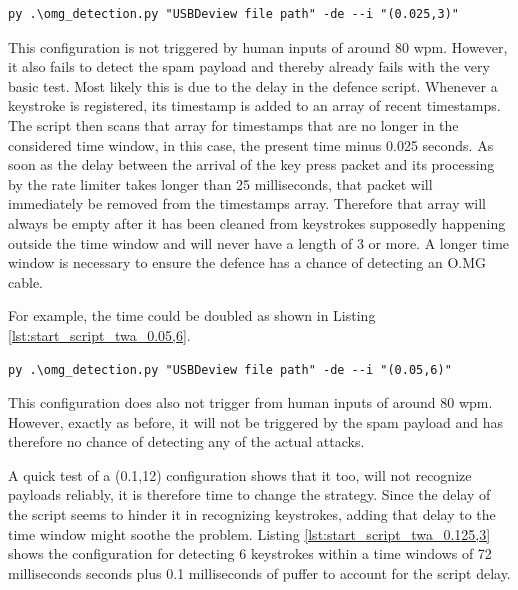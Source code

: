 \begin{lstlisting}[caption={start defence Script with TWA (0.025,3)},label={lst:start_script_twa_0.025,3}, captionpos=b]
 py .\omg_detection.py "USBDeview file path" -de --i "(0.025,3)"
\end{lstlisting}



This configuration is not triggered by human inputs of around 80 wpm. However, it also fails to detect the spam payload and thereby already fails with the very basic test. Most likely this is due to the delay in the defence script. Whenever a keystroke is registered, its timestamp is added to an array of recent timestamps. The script then scans that array for timestamps that are no longer in the considered time window, in this case, the present time minus 0.025 seconds. As soon as the delay between the arrival of the key press packet and its processing by the rate limiter takes longer than 25 milliseconds, that packet will immediately be removed from the timestamps array. Therefore that array will always be empty after it has been cleaned from keystrokes supposedly happening outside the time window and will never have a length of 3 or more. A longer time window is necessary to ensure the defence has a chance of detecting an O.MG cable.

For example, the time could be doubled as shown in Listing \ref{lst:start_script_twa_0.05,6}.

\begin{lstlisting}[caption={start defence Script with TWA (0.05,6)},label={lst:start_script_twa_0.05,6}, captionpos=b]
 py .\omg_detection.py "USBDeview file path" -de --i "(0.05,6)"
\end{lstlisting}

This configuration does also not trigger from human inputs of around 80 wpm. However, exactly as before, it will not be triggered by the spam payload and has therefore no chance of detecting any of the actual attacks.


A quick test of a (0.1,12) configuration shows that it too, will not recognize payloads reliably, it is therefore time to change the strategy.
Since the delay of the script seems to hinder it in recognizing keystrokes, adding that delay to the time window might soothe the problem. Listing \ref{lst:start_script_twa_0.125,3} shows the configuration for detecting 6 keystrokes within a time windows of 72 milliseconds seconds plus 0.1 milliseconds of puffer to account for the script delay. 

